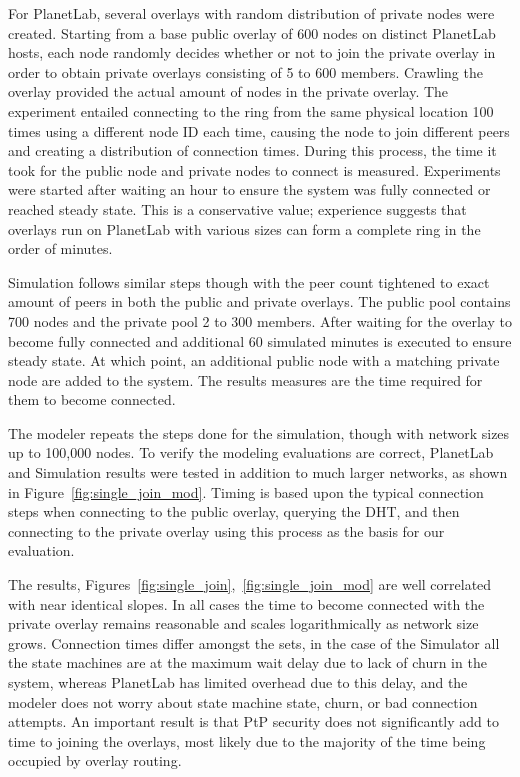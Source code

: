 For PlanetLab, several overlays with random distribution of private nodes were
created.  Starting from a base public overlay of 600 nodes on distinct PlanetLab
hosts, each node randomly decides whether or not to join the private overlay in
order to obtain private overlays consisting of 5 to 600 members.  Crawling the
overlay provided the actual amount of nodes in the private overlay.  The
experiment entailed connecting to the ring from the same physical location 100
times using a different node ID each time, causing the node to join different
peers and creating a distribution of connection times. During this process, the
time it took for the public node and private nodes to connect is measured.  
Experiments were started after waiting an hour to ensure the system was fully
connected or reached steady state.  This is a conservative value; experience
suggests that overlays run on PlanetLab with various sizes can form a complete
ring in the order of minutes.

Simulation follows similar steps though with the peer count tightened to exact
amount of peers in both the public and private overlays.  The public pool
contains 700 nodes and the private pool 2 to 300 members.  After waiting for
the overlay to become fully connected and additional 60 simulated minutes is
executed to ensure steady state.  At which point, an additional public node
with a matching private node are added to the system.  The results measures are
the time required for them to become connected.

The modeler repeats the steps done for the simulation, though with network
sizes up to 100,000 nodes.  To verify the modeling evaluations are correct,
PlanetLab and Simulation results were tested in addition to much larger
networks, as shown in Figure~\ref{fig:single_join_mod}.  Timing is based upon
the typical connection steps when connecting to the public overlay, querying
the DHT, and then connecting to the private overlay using this process as the
basis for our evaluation.

The results, Figures~\ref{fig:single_join},~\ref{fig:single_join_mod} are well
correlated with near identical slopes.  In all cases the time to become
connected with the private overlay remains reasonable and scales logarithmically
as network size grows.  Connection times differ amongst the sets, in the case of
the Simulator all the state machines are at the maximum wait delay due to lack
of churn in the system, whereas PlanetLab has limited overhead due to this
delay, and the modeler does not worry about state machine state, churn, or bad
connection attempts.  An important result is that PtP security does not
significantly add to time to joining the overlays, most likely due to the
majority of the time being occupied by overlay routing.

